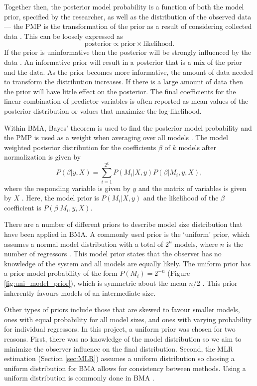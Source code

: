 \documentclass{sfuthesis}
\begin{document}
Together then, the posterior model probability is a function of both the model prior, specified by the researcher, as well as the distribution of the observed data --- the PMP is the transformation of the prior as a result of considering collected data \citep{Wasserman2000}. This can be loosely expressed as
\begin{equation}
\textrm{posterior} \propto \textrm{prior} \times \textrm{likelihood}.
\end{equation}
If the prior is uninformative then the posterior will be strongly influenced by the data \citep{Wasserman2000}. An informative prior will result in a posterior that is a mix of the prior and the data. As the prior becomes more informative, the amount of data needed to transform the distribution increases. If there is a large amount of data then the prior will have little effect on the posterior. The final coefficients for the linear combination of predictor variables is often reported as mean values of the posterior distribution or values that maximize the log-likelihood. 

Within BMA, Bayes' theorem is used to find the posterior model probability and the PMP is used as a weight when averaging over all models \citep{Wasserman2000}. The model weighted posterior distribution for the coefficients $\beta$ of $k$ models after normalization is given by 
\begin{equation}
P(\beta| y,X) = \sum\limits_{i=1}^{2^k} P(M_i | X,y)P(\beta | M_i , y, X),
\end{equation}
where the responding variable is given by $y$ and the matrix of variables is given by $X$ \citep{Raftery1997}. Here, the model prior is $P(M_i | X,y)$ and the likelihood of the $\beta$ coefficient is $P(\beta | M_i , y, X)$.

There are a number of different priors to describe model size distribution that have been applied in BMA. A commonly used prior is the `uniform' prior, which assumes a normal model distribution with a total of $2^n$ models, where $n$ is the number of regressors \citep{Wasserman2000}.  This model prior states that the observer has no knowledge of the system and all models are equally likely. The uniform prior has a prior model probability of the form $P(M_i)=2^{-n}$ (Figure \ref{fig:uni_model_prior}), which is symmetric about the mean $n/2$ \citep{Zeugner2015}. This prior inherently favours models of an intermediate size. 

Other types of priors include those that are skewed to favour smaller models, ones with equal probability for all model sizes, and ones with varying probability for individual regressors. In this project, a uniform prior was chosen for two reasons. First, there was no knowledge of the model distribution so we aim to minimize the observer influence on the final distribution. Second, the MLR estimation (Section \ref{sec:MLR}) assumes a uniform distribution so chosing a uniform distribution for BMA allows for consistency between methods. Using a uniform distribution is commonly done in BMA \citep{Wasserman2000}.
\end{document}

